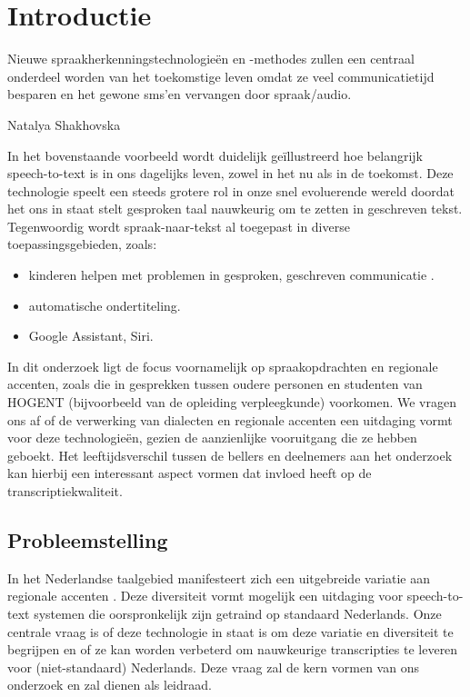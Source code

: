 \section{Introductie}%
\label{sec:introductie}
\epigraph{Nieuwe spraakherkenningstechnologieën en -methodes zullen een centraal onderdeel worden van het toekomstige leven omdat ze veel communicatietijd besparen en het gewone sms'en vervangen door spraak/audio.}{Natalya Shakhovska}

In het bovenstaande voorbeeld wordt duidelijk geïllustreerd hoe belangrijk speech-to-text is in ons dagelijks leven, zowel in het nu als in de toekomst. Deze technologie speelt een steeds grotere rol in onze snel evoluerende wereld doordat het ons in staat stelt gesproken taal nauwkeurig om te zetten in geschreven tekst. Tegenwoordig wordt spraak-naar-tekst al  toegepast in diverse toepassingsgebieden, zoals:
\begin{itemize}
    \item kinderen helpen met problemen in gesproken, geschreven communicatie \autocite{Kambouri2023}.
    \item automatische ondertiteling.
    \item Google Assistant, Siri.
\end{itemize}

In dit onderzoek ligt de focus voornamelijk op spraakopdrachten en regionale accenten, zoals die in gesprekken tussen oudere personen en studenten van HOGENT (bijvoorbeeld van de opleiding verpleegkunde) voorkomen. We vragen ons af of de verwerking van dialecten en regionale accenten een uitdaging vormt voor deze technologieën, gezien de aanzienlijke vooruitgang die ze hebben geboekt. Het leeftijdsverschil tussen de bellers en deelnemers aan het onderzoek kan hierbij een interessant aspect vormen dat invloed heeft op de transcriptiekwaliteit.

\subsection{Probleemstelling}
In het Nederlandse taalgebied manifesteert zich een uitgebreide variatie aan regionale accenten \autocite{barbiers2004reflexieven}. Deze diversiteit vormt mogelijk een uitdaging voor speech-to-text systemen die oorspronkelijk zijn getraind op standaard Nederlands. Onze centrale vraag is of deze technologie in staat is om deze variatie en diversiteit te begrijpen en of ze kan worden verbeterd om nauwkeurige transcripties te leveren voor (niet-standaard) Nederlands. Deze vraag zal de kern vormen van ons onderzoek en zal dienen als leidraad.

